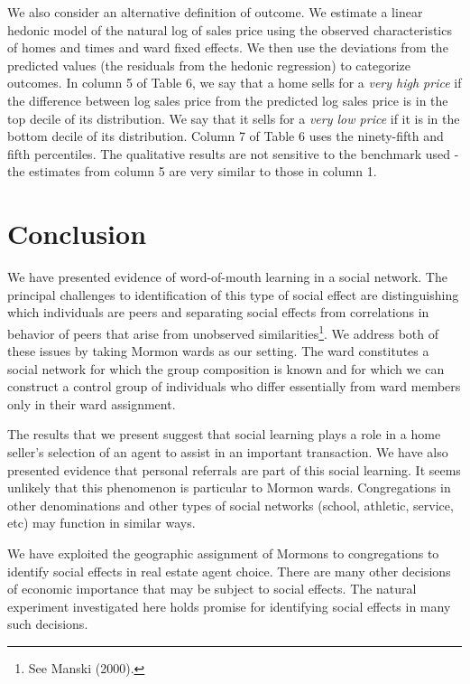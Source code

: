 \documentclass[12pt]{article}
\begin{document}
We also consider an alternative definition of outcome. We estimate a
linear hedonic model of the natural log of sales price using the
observed characteristics of homes and times and ward fixed effects. We
then use the deviations from the predicted values (the residuals from
the hedonic regression) to categorize outcomes. In column 5 of Table
6, we say that a home sells for a \emph{very high price} if the difference between log sales price from the predicted log sales price is in the top decile of its
distribution. We say that it sells for a \emph{very low price} if it is
in the bottom decile of its distribution. Column 7 of Table 6 uses the
ninety-fifth and fifth percentiles. The qualitative results are not
sensitive to the benchmark used - the estimates from column 5 are very
similar to those in column 1.

\section{Conclusion}
We have presented evidence of word-of-mouth learning in a social network.  The principal challenges to identification of this type of social effect
are distinguishing which individuals are peers and separating social effects from correlations in behavior of peers that arise from unobserved
similarities\footnote{See Manski (2000).}.  We address both of these issues by taking Mormon wards as our setting.  The ward constitutes a social
network for which the group composition is known and for which we can construct a control group of individuals who differ essentially from ward
members only in their ward assignment.

The results that we present suggest that social learning plays a role in a home seller's selection of an agent to assist in an important transaction.
We have also presented evidence that personal referrals are part of this social learning.  It seems unlikely that this phenomenon is particular to Mormon
wards.  Congregations in other denominations and other types of social networks (school, athletic, service, etc) may function in similar ways.

We have exploited the geographic assignment of Mormons to congregations to identify social effects in real estate agent choice.  There are many
other decisions of economic importance that may be subject to social effects.  The natural experiment investigated here holds promise for identifying
social effects in many such decisions.


\pagebreak
\end{document}
